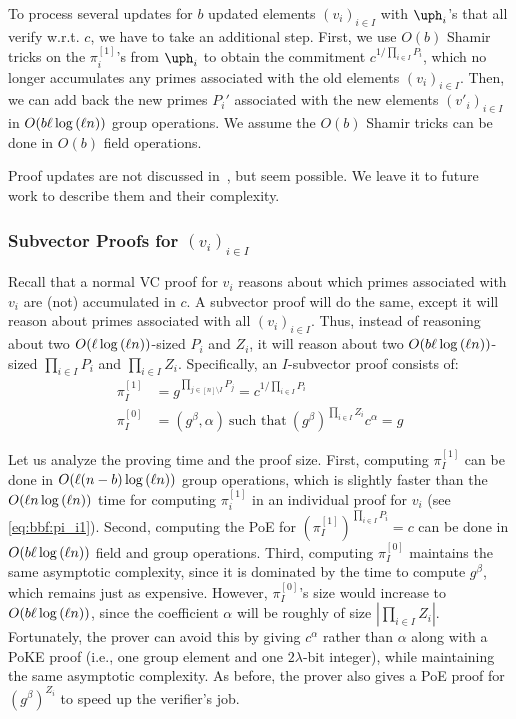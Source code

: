 To process several updates for $b$ updated elements $(v_i)_{i\in I}$ with $\uph_i$'s that all verify w.r.t. $c$, we have to take an additional step.
First, we use $O(b)$ Shamir tricks on the $\pi_i^{[1]}$'s from $\uph_i$ to obtain the commitment $c^{1/\prod_{i\in I} P_i}$, which no longer accumulates any primes associated with the old elements $(v_i)_{i\in I}$.
Then, we can add back the new primes $P_i'$ associated with the new elements $(v'_i)_{i\in I}$ in $O(b\ell \log{(\ell n)})$ group operations.
We assume the $O(b)$ Shamir tricks can be done in $O(b)$ field operations.

Proof updates are not discussed in~\cite{BBF19}, but seem possible.
We leave it to future work to describe them and their complexity.

\subsubsection{Subvector Proofs for $(v_i)_{i\in I}$}
Recall that a normal VC proof for $v_i$ reasons about which primes associated with $v_i$ are (not) accumulated in $c$.
A subvector proof will do the same, except it will reason about primes associated with all $(v_i)_{i\in I}$.
Thus, instead of reasoning about two $O(\ell \log{(\ell n)})$-sized $P_i$ and $Z_i$, it will reason about two $O(b\ell\log{(\ell n)})$-sized $\prod_{i\in I} P_i$ and $\prod_{i\in I} Z_i$.
Specifically, an $I$-subvector proof consists of:
\begin{align}
\pi_I^{[1]} &=g^{\prod_{j\in [n]\setminus I} P_j} = c^{1/\prod_{i\in I} P_i}\\
\pi_I^{[0]} &= \left(g^\beta, \alpha\right)\ \text{such that}\ (g^\beta)^{\prod_{i\in I} Z_i} c^\alpha = g
\end{align}

Let us analyze the proving time and the proof size.
First, computing $\pi_I^{[1]}$ can be done in $O(\ell (n-b) \log{(\ell n)})$ group operations, which is slightly faster than the $O(\ell n\log{(\ell n)})$ time for computing $\pi_i^{[1]}$ in an individual proof for $v_i$ (see \cref{eq:bbf:pi_i1}).
Second, computing the PoE for $\left(\pi_I^{[1]}\right)^{\prod_{i\in I} P_i} = c$ can be done in  $O(b\ell\log{(\ell n)})$ field and group operations.
Third, computing $\pi_I^{[0]}$ maintains the same asymptotic complexity, since it is dominated by the time to compute $g^\beta$, which remains just as expensive.
However, $\pi_I^{[0]}$'s size would increase to $O(b\ell\log{(\ell n)})$, since the \bezout coefficient $\alpha$ will be roughly of size $|\prod_{i\in I} Z_i|$.
Fortunately, the prover can avoid this by giving $c^\alpha$ rather than $\alpha$ along with a PoKE proof (i.e., one group element and one $2\lambda$-bit integer), while maintaining the same asymptotic complexity.
As before, the prover also gives a PoE proof for $\left(g^{\beta}\right)^{Z_i}$ to speed up the verifier's job.

